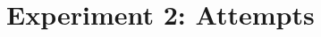\documentclass[paper.tex]{subfiles}
\begin{document}
\section{Experiment 2: Attempts }


\end{document}
